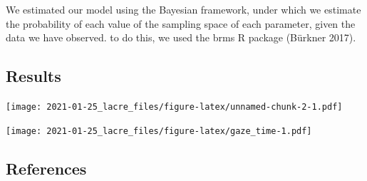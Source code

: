 \documentclass[
]{article}
\begin{document}
We estimated our model using the Bayesian framework, under which we
estimate the probability of each value of the sampling space of each
parameter, given the data we have observed. to do this, we used the brms
R package (Bürkner 2017).

\hypertarget{results}{%
\subsection{Results}\label{results}}

\texttt{[image: 2021-01-25\_lacre\_files/figure-latex/unnamed-chunk-2-1.pdf]}

\texttt{[image: 2021-01-25\_lacre\_files/figure-latex/gaze\_time-1.pdf]}

\hypertarget{references}{%
\subsection*{References}\label{references}}
\end{document}
